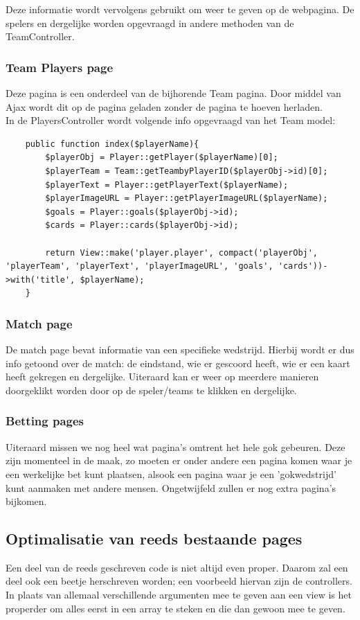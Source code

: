 \documentclass[11pt, a4paper]{article}
\begin{document}
Deze informatie wordt vervolgens gebruikt om weer te geven op de webpagina. De spelers en dergelijke worden opgevraagd in andere methoden van de TeamController.
 
\subsubsection{Team Players page}
Deze pagina is een onderdeel van de bijhorende Team pagina. Door middel van Ajax wordt dit op de pagina geladen zonder de pagina te hoeven herladen.
\\
In de PlayersController wordt volgende info opgevraagd van het Team model:
\begin{lstlisting}
	public function index($playerName){
		$playerObj = Player::getPlayer($playerName)[0];
		$playerTeam = Team::getTeambyPlayerID($playerObj->id)[0];		
		$playerText = Player::getPlayerText($playerName);
		$playerImageURL = Player::getPlayerImageURL($playerName);
		$goals = Player::goals($playerObj->id);
		$cards = Player::cards($playerObj->id);
			
		return View::make('player.player', compact('playerObj', 'playerTeam', 'playerText', 'playerImageURL', 'goals', 'cards'))->with('title', $playerName);
	}
\end{lstlisting}
 
\subsubsection{Match page}
De match page bevat informatie van een specifieke wedstrijd. Hierbij wordt er dus info getoond over de match: de eindstand, wie er gescoord heeft, wie er een kaart heeft gekregen en dergelijke. Uiteraard kan er weer op meerdere manieren doorgeklikt worden door op de speler/teams te klikken en dergelijke.

\subsubsection{Betting pages}
Uiteraard missen we nog heel wat pagina's omtrent het hele gok gebeuren. Deze zijn momenteel in de maak, zo moeten er onder andere een pagina komen waar je een werkelijke bet kunt plaatsen, alsook een pagina waar je een 'gokwedstrijd' kunt aanmaken met andere mensen. Ongetwijfeld zullen er nog extra pagina's bijkomen.

\subsection{Optimalisatie van reeds bestaande pages}
Een deel van de reeds geschreven code is niet altijd even proper. Daarom zal een deel ook een beetje herschreven worden; een voorbeeld hiervan zijn de controllers. In plaats van allemaal verschillende argumenten mee te geven aan een view is het properder om alles eerst in een array te steken en die dan gewoon mee te geven. 
\end{document}
